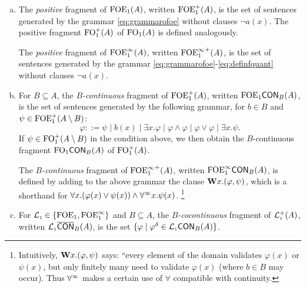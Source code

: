 \begin{definition}
\begin{enumerate}[(a)]
\item The \emph{positive} fragment of $\mathrm{FOE}_1(A)$, written $\mathrm{FOE}_1^{+}(A)$, is the set of sentences generated by the grammar \eqref{eq:grammarofoe} without clauses $\lnot a(x)$. The positive fragment $\mathrm{FO}_1^{+}(A)$ of $\mathrm{FO}_1(A)$ is defined analogously. 

The \emph{positive} fragment of $\mathrm{FOE}^{\infty}_1(A)$, written ${\mathrm{FOE}^{\infty}_1}^{+}(A)$, is the set of sentences generated by the grammar \eqref{eq:grammarofoe}-\eqref{eq:definfquant} without clauses $\lnot a(x)$. 
\item For $B \subseteq A$, the \emph{$B$-continuous} fragment of $\mathrm{FOE}_1^{+}(A)$, written $\mathrm{FOE}_1\mathsf{CON}_{B}(A)$, is the set of sentences generated by the following grammar, for $b \in B$ and $\psi \in \mathrm{FOE}_1^{+}(A \setminus B)$:
\[
\varphi ::= \psi \mid b(x) \mid \exists x.\varphi \mid \varphi \land \varphi \mid \varphi \lor \varphi \mid \exists x. \psi.
\]
If $\psi \in \mathrm{FO}_1^{+}(A \setminus B)$ in the condition above, we then obtain the $B$-continuous fragment $\mathrm{FO}_1\mathsf{CON}_{B}(A)$ of $\mathrm{FO}_1^{+}(A)$.

The  \emph{$B$-continuous} fragment of ${\mathrm{FOE}^{\infty}_1}^{+}(A)$, written $\mathrm{FOE}^{\infty}_1\mathsf{CON}_{B}(A)$, is defined by adding to the above grammar the clause $\mathbf{W} x.(\varphi,\psi)$, which is a shorthand for $\forall x.(\varphi(x) \lor \psi(x)) \land \forall^\infty x.\psi(x)$. \footnote{Intuitively, $\mathbf{W} x.(\varphi,\psi)$ says: ``every element of the domain validates $\varphi(x)$ or $\psi(x)$, but only finitely many need to validate $\varphi(x)$ (where $b \in B$ may occur). Thus $\forall^\infty$ makes a certain use of $\forall$ compatible with continuity.}
\item For $\mathcal{L}_{\scriptscriptstyle 1} \in \{\mathrm{FOE}_1,\mathrm{FOE}^{\infty}_1 \}$ and $B \subseteq A$, the \emph{$B$-cocontinuous} fragment of $\mathcal{L}_{\scriptscriptstyle 1}^{+}(A)$, written $\mathcal{L}_{\scriptscriptstyle 1}\overline{\mathsf{CON}}_{B}(A)$, is the set $\{\varphi \mid \varphi^\delta \in \mathcal{L}_{\scriptscriptstyle 1}\mathsf{CON}_{B}(A)\}$.
\end{enumerate}
\end{definition}



